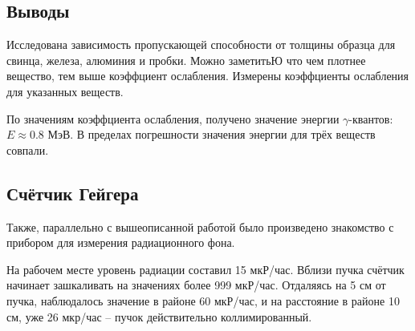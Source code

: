 \subsection*{Выводы}

Исследована зависимость пропускающей способности от толщины образца для свинца, железа, алюминия и пробки. Можно заметитьЮ что чем плотнее вещество, тем выше коэффциент ослабления. Измерены коэффциенты ослабления для указанных веществ.

 По значениям коэффциента ослабления, получено значение энергии $\gamma$-квантов: $E \approx 0.8$ МэВ. В пределах погрешности значения энергии для трёх веществ совпали. 






 \subsection*{Счётчик Гейгера}


 Также, параллельно с вышеописанной работой было произведено знакомство с прибором для измерения радиационного фона. 

 На рабочем месте уровень радиации составил 15 мкР/час. Вблизи пучка счётчик начинает зашкаливать на значениях более 999 мкР/час. Отдаляясь на 5 см от пучка, наблюдалось значение в районе 60 мкР/час, и на расстояние в районе 10 см, уже 26 мкр/час -- пучок действительно коллимированный.